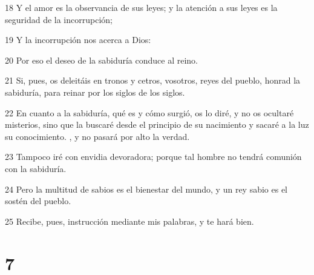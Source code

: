 \par 18 Y el amor es la observancia de sus leyes; y la atención a sus leyes es la seguridad de la incorrupción;
\par 19 Y la incorrupción nos acerca a Dios:
\par 20 Por eso el deseo de la sabiduría conduce al reino.
\par 21 Si, pues, os deleitáis en tronos y cetros, vosotros, reyes del pueblo, honrad la sabiduría, para reinar por los siglos de los siglos.
\par 22 En cuanto a la sabiduría, qué es y cómo surgió, os lo diré, y no os ocultaré misterios, sino que la buscaré desde el principio de su nacimiento y sacaré a la luz su conocimiento. , y no pasará por alto la verdad.
\par 23 Tampoco iré con envidia devoradora; porque tal hombre no tendrá comunión con la sabiduría.
\par 24 Pero la multitud de sabios es el bienestar del mundo, y un rey sabio es el sostén del pueblo.
\par 25 Recibe, pues, instrucción mediante mis palabras, y te hará bien.

\chapter{7}

